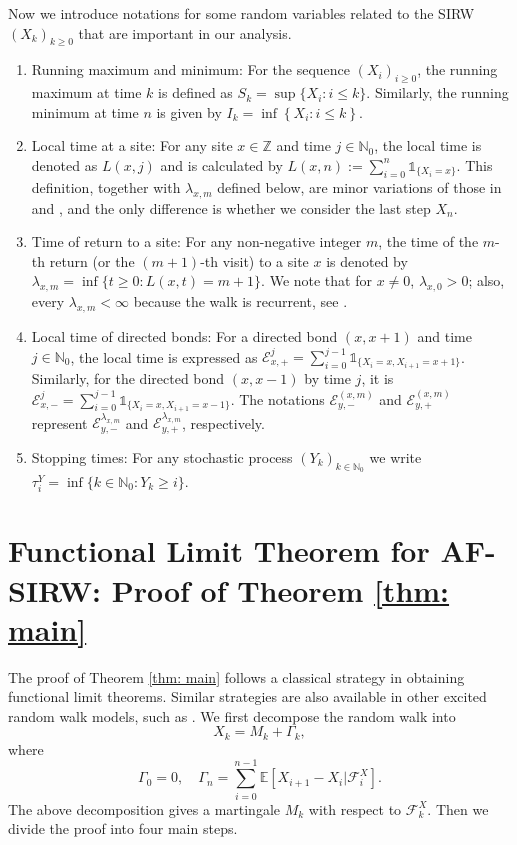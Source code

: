 \documentclass[twoside,12pt, a4paper, final]{article}
\numberwithin{equation}{section}
\theoremstyle{remark}
\begin{document}
	Now we introduce notations for some random variables related to the SIRW $(X_k)_{k\geq0}$ that are important in our analysis.
	\begin{enumerate}
		\item Running maximum and minimum: For the sequence $(X_i)_{i \ge 0}$, the running maximum at time $k$ is defined as $S_k = \sup\{X_i : i \le k\}$. Similarly, the running minimum at time $n$ is given by $I_k = \inf \left\{X_i: i \le k\right\}$.
		\item
		Local time at a site: For any site $x \in \mathbb{Z}$ and time $j \in \mathbb{N}_0$, the local time is denoted as $L(x,j)$ and is calculated by $L(x,n):= \sum_{i=0}^n \mathbb{1}_{\{X_i=x\}}$. 
		This definition, together with $\lambda_{x, m}$ defined below, are minor variations of those in \cite{KMP23} and \cite{KP16}, and the only difference is whether we consider the last step $X_n$.
		\item
		Time of return to a site: For any non-negative integer $m$, the time of the $m$-th return (or the $(m+1)$-th visit) to a site $x$ is denoted by $\lambda_{x,m} = \inf\{t \geq 0: L(x,t) = m+1\}$. 
		We note that for $x\neq 0$, $\lambda_{x,0} > 0$; also, every $\lambda_{x,m}<\infty$ because the walk is recurrent, see \cite{T96}.
		\item
		Local time of directed bonds: For a directed bond $(x,x+1)$ and time $j \in \mathbb{N}_0$, the local time is expressed as $\mathcal{E}^j_{x,+} = \sum_{i=0}^{j-1} \mathbb{1}_{\{X_i=x, X_{i+1} =x+1\}}$. Similarly, for the directed bond $(x,x-1)$ by time $j$, it is $\mathcal{E}^j_{x,-} = \sum_{i=0}^{j-1} \mathbb{1}_{\{X_i=x, X_{i+1} =x-1\}}$.
		The notations $\mathcal{E}^{(x,m)}_{y, -}$ and $\mathcal{E}^{(x,m)}_{y, +}$ represent $\mathcal{E}^{\lambda_{x,m}}_{y,-}$ and $\mathcal{E}^{\lambda_{x,m}}_{y,+}$, respectively.
		\item
		Stopping times: For any stochastic process $(Y_k)_{k \in \mathbb{N}_0}$ we write $\tau^Y_{i} = \inf \{k \in  \mathbb{N}_0: Y_k \ge  i\}$.
	\end{enumerate}
	\section{Functional Limit Theorem for AF-SIRW: Proof of Theorem \ref{thm: main}}
	\label{sec: proof of main}
	
	The proof of Theorem \ref{thm: main} follows a classical strategy in obtaining functional limit theorems. 
	Similar strategies are also available in other excited random walk models, such as \cite{KP16,KMP23}.
	We first decompose the random walk into
	\begin{equation}
		\label{eqn:decomposition}
		X_k = M_k+ \Gamma_k 
		,\end{equation} 
	where
	\[ 
	\Gamma_0 = 0, \quad \Gamma_n = \sum_{i=0}^{n-1} \mathbb{E}\left[ X_{i+1}-X_i | \mathcal{F}_i^X 
	\right].
	\]
	The above decomposition gives a martingale $M_k$ with respect to $\mathcal{F}_k^X.$ 
	Then we divide the proof into four main steps. 
	
\end{document}
